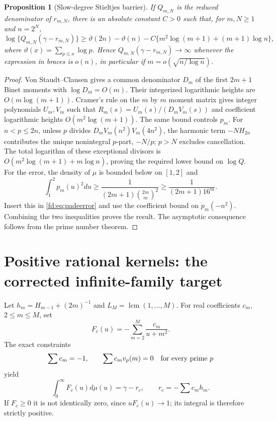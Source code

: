 \documentclass[11pt,a4paper]{article}
\newtheorem{proposition}[theorem]{Proposition}
\theoremstyle{definition}
\theoremstyle{remark}
\numberwithin{equation}{section}
\begin{document}
\begin{proposition}[Slow-degree Stieltjes barrier]\label{fd:prop:slow}
If $Q_{m,N}$ is the reduced denominator of $r_{m,N}$, there is an
absolute constant $C>0$ such that, for $m,N\ge1$ and $n=2^N$,
\[
 \log\{Q_{m,N}(\gamma-r_{m,N})\}
 \ge\vartheta(2n)-\vartheta(n)
 -C\{m^2\log(m+1)+(m+1)\log n\},
\]
where $\vartheta(x)=\sum_{p\le x}\log p$.  Hence
$Q_{m,N}(\gamma-r_{m,N})\to\infty$ whenever the expression in braces
is $o(n)$, in particular if $m=o(\sqrt{n/\log n})$.
\end{proposition}
\begin{proof}
Von Staudt--Clausen gives a common denominator $D_m$ of the first $2m+1$
Binet moments with $\log D_m=O(m)$.  Their integerized logarithmic
heights are $O(m\log(m+1))$.  Cramer's rule on the $m$ by $m$ moment
matrix gives integer polynomials $U_m,V_m$ such that
$R_m(s)=U_m(s)/(D_mV_m(s))$ and coefficient logarithmic heights
$O(m^2\log(m+1))$.  The same bound controls $p_m$.
For $n<p\le2n$, unless $p$ divides
$D_mV_m(n^2)V_m(4n^2)$, the harmonic term $-NH_{2n}$ contributes the
unique nonintegral $p$-part, $-N/p$; $p>N$ excludes cancellation.
The total logarithm of these exceptional divisors is
$O(m^2\log(m+1)+m\log n)$, proving the required lower bound on $\log Q$.
For the error, the density of $\mu$ is bounded below on $[1,2]$ and
\[
 \int_1^2p_m(u)^2du\ge
 \frac1{(2m+1)\binom{2m}{m}^2}\ge\frac1{(2m+1)16^m}.
\]
Insert this in \eqref{fd:eq:padeerror} and use the coefficient bound on
$p_m(-n^2)$.  Combining the two inequalities proves the result.
The asymptotic consequence follows from the prime number theorem.
\end{proof}

\section{Positive rational kernels: the corrected infinite-family target}
\label{fd:sec:positivehistory}
Let $h_m=H_{m-1}+(2m)^{-1}$ and $L_M=\operatorname{lcm}(1,\ldots,M)$.
For real coefficients $c_m$, $2\le m\le M$, set
\[
 F_c(u)=-\sum_{m=2}^M\frac{c_m}{u+m^2}.
\]
The exact constraints
\begin{equation}\label{fd:eq:positiveconstraints}
 \sum c_m=-1,\qquad \sum c_mv_p(m)=0\quad\hbox{for every prime }p
\end{equation}
yield
\begin{equation}\label{fd:eq:positiveidentity}
 \int_0^\infty F_c(u)d\mu(u)=\gamma-r_c,
 \qquad r_c=-\sum c_mh_m.
\end{equation}
If $F_c\ge0$ it is not identically zero, since $uF_c(u)\to1$;
its integral is therefore strictly positive.
\end{document}
